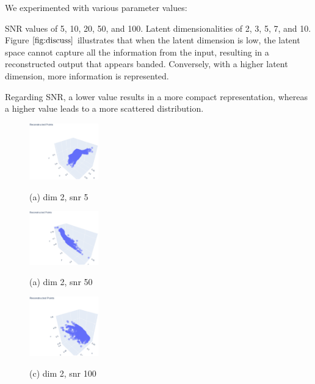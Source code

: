 \documentclass{article}
\begin{document}
We experimented with various parameter values:

SNR values of 5, 10, 20, 50, and 100.
Latent dimensionalities of 2, 3, 5, 7, and 10.
Figure $\ref{fig:discuss}$ illustrates that when the latent dimension is low, the latent space cannot capture all the information from the input, resulting in a reconstructed output that appears banded. Conversely, with a higher latent dimension, more information is represented.

Regarding SNR, a lower value results in a more compact representation, whereas a higher value leads to a more scattered distribution.
\begin{figure}[htb]
  \centering
  \begin{minipage}[b]{0.3\linewidth}
    \centering
    \includegraphics[width=3.0cm]{images/reconstructed_2_5}
    \centerline{(a) dim 2, snr 5}\medskip
  \end{minipage}
  \hfill
  \begin{minipage}[b]{0.3\linewidth}
    \centering
    \includegraphics[width=3.0cm]{images/reconstructed_2_50}
    \centerline{(a) dim 2, snr 50}\medskip
  \end{minipage}
  \hfill
  \begin{minipage}[b]{0.3\linewidth}
    \centering
    \includegraphics[width=3.0cm]{images/reconstructed_2_100}
    \centerline{(c) dim 2, snr 100}\medskip
  \end{minipage}
  
  

\end{figure}
\end{document}
